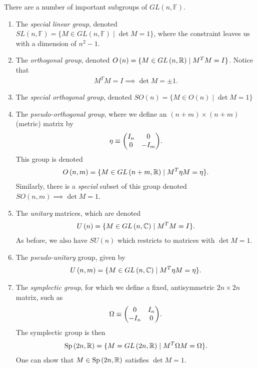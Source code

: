 There are a number of important subgroups of $GL \left( n, \mathbb{F} \right)$.
\begin{enumerate}[label=\arabic*.]
    \item The \textit{special linear group}, denoted $SL \left( n, \mathbb{F} \right) = \{ M \in GL \left( n, \mathbb{F} \right)  \mid  \det M = 1\} $, where the constraint leaves us with a dimension of $n^2 - 1$.
    \item The \textit{orthogonal group}, denoted $O \left( n \right) = \{ M \in GL \left( n, \mathbb{R} \right)  \mid  M^{T} M = I\} $. Notice that
        \begin{align}
            M^{T} M = I \implies \det M = \pm 1
        .\end{align}
    \item The \textit{special orthogonal group}, denoted $SO \left( n \right) = \{M \in O \left( n \right)  \mid  \det M = 1\} $
    \item The \textit{pseudo-orthogonal group}, where we define an $\left( n + m \right) \times  \left( n + m \right) $ (metric) matrix by
        \begin{align}
            \eta \equiv \mqty( I_n & 0 \\ 0 & - I_m )
        .\end{align}
        This group is denoted
        \begin{align}
            O\left( n,m \right) = \{M \in GL \left( n + m, \mathbb{R} \right)  \mid M^{T} \eta M = \eta \} 
        .\end{align}
        Similarly, there is a \textit{special} subset of this group denoted $SO \left( n,m \right) \implies \det M = 1$.
    \item The \textit{unitary} matrices, which are denoted
        \begin{align}
            U \left( n \right) = \{M \in GL \left( n, \mathbb{C} \right)  \mid  M^{T} M = I \} 
        .\end{align}
        As before, we also have $SU\left( n \right) $ which restricts to matrices with $\det M = 1$.
    \item The \textit{pseudo-unitary} group, given by
        \begin{align}
            U \left( n,m \right) = \{M \in GL \left( n, \mathbb{C} \right)  \mid  M^{T} \eta M = \eta\}  
        .\end{align}
    \item The \textit{symplectic group}, for which we define a fixed, antisymmetric $2n \times 2n$ matrix, such as
        \begin{align}
            \Omega \equiv \mqty( 0 & I_n \\
            -I_n & 0 )
        .\end{align}
        The symplectic group is then
        \begin{align}
            \text{Sp}\left( 2n, \mathbb{R} \right) = \{ M = GL \left( 2n, \mathbb{R} \right)  \mid  M^{T} \Omega M = \Omega \} 
        .\end{align}
        One can show that $M \in \text{Sp}\left( 2n, \mathbb{R} \right) $ satisfies $\det M = 1$.
\end{enumerate}

